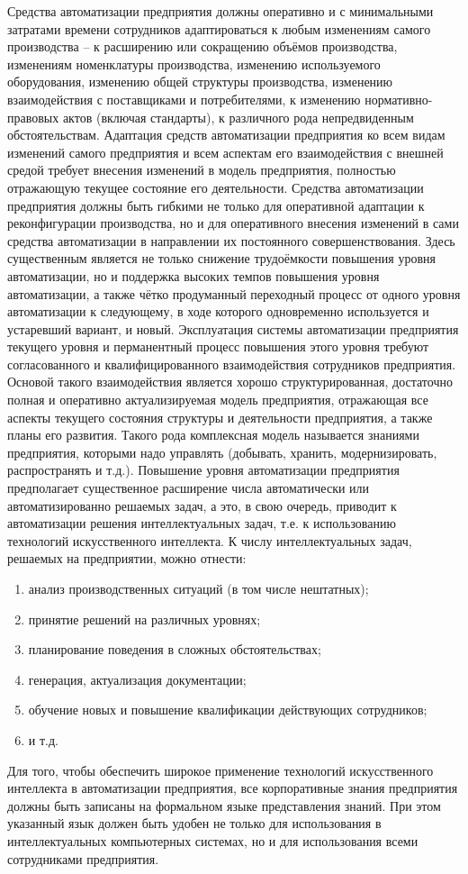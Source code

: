 Средства автоматизации предприятия должны оперативно и с минимальными затратами времени сотрудников адаптироваться к любым изменениям самого производства – к расширению или сокращению объёмов производства, изменениям номенклатуры производства, изменению используемого оборудования, изменению общей структуры производства, изменению взаимодействия с поставщиками и потребителями, к изменению нормативно-правовых актов (включая стандарты), к различного рода непредвиденным обстоятельствам.
Адаптация средств автоматизации предприятия ко всем видам изменений самого предприятия и всем аспектам его взаимодействия с внешней средой требует внесения изменений в модель предприятия, полностью отражающую текущее состояние его деятельности.
Средства автоматизации предприятия должны быть гибкими не только для оперативной адаптации к реконфигурации производства, но и для оперативного внесения изменений в сами средства автоматизации в направлении их постоянного совершенствования. Здесь существенным является не только снижение трудоёмкости повышения уровня автоматизации, но и поддержка высоких темпов повышения уровня автоматизации, а также чётко продуманный переходный процесс от одного уровня автоматизации к следующему, в ходе которого одновременно используется и устаревший вариант, и новый.
Эксплуатация системы автоматизации предприятия текущего уровня и перманентный процесс повышения этого уровня требуют согласованного и квалифицированного взаимодействия сотрудников предприятия. Основой такого взаимодействия является хорошо структурированная, достаточно полная и оперативно актуализируемая модель предприятия, отражающая все аспекты текущего состояния структуры и деятельности предприятия, а также планы его развития. Такого рода комплексная модель называется знаниями предприятия, которыми надо управлять (добывать, хранить, модернизировать, распространять и т.д.).
Повышение уровня автоматизации предприятия предполагает существенное расширение числа автоматически или автоматизированно решаемых задач, а это, в свою очередь, приводит к автоматизации решения интеллектуальных задач, т.е. к использованию технологий искусственного интеллекта. К числу интеллектуальных задач, решаемых на предприятии, можно отнести:
\begin{enumerate}
    \item анализ производственных ситуаций (в том числе нештатных);
    \item принятие решений на различных уровнях;
    \item планирование поведения в сложных обстоятельствах;
    \item генерация, актуализация документации;
    \item обучение новых и повышение квалификации действующих сотрудников;
    \item и т.д.
\end{enumerate}
Для того, чтобы обеспечить широкое применение технологий искусственного интеллекта в автоматизации предприятия, все корпоративные знания предприятия должны быть записаны на формальном языке представления знаний. При этом указанный язык должен быть удобен не только для использования в интеллектуальных компьютерных системах, но и для использования всеми сотрудниками предприятия.

